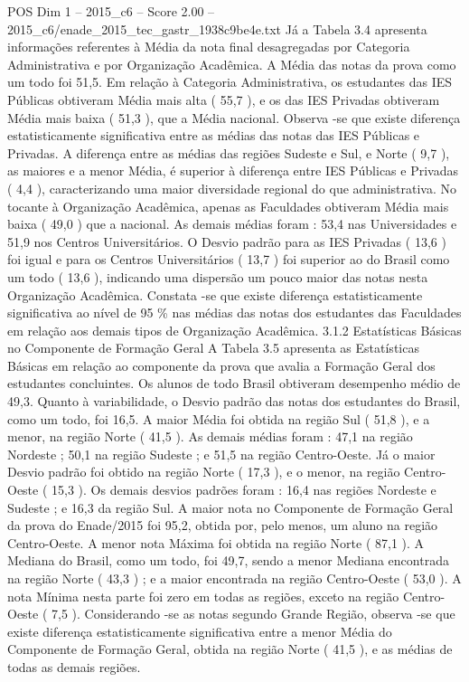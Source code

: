 \begin{textsample}{POS Dim 1 – 2015\_c6 – Score 2.00 – 2015\_c6/enade\_2015\_tec\_gastr\_1938c9be4e.txt}
Já a Tabela 3.4 apresenta informações referentes à Média da nota final desagregadas por Categoria Administrativa e por Organização Acadêmica.
A Média das notas da prova como um todo foi 51,5.
Em relação à Categoria Administrativa, os estudantes das IES Públicas obtiveram Média mais alta ( 55,7 ), e os das IES Privadas obtiveram Média mais baixa ( 51,3 ), que a Média nacional.
Observa -se que existe diferença estatisticamente significativa entre as médias das notas das IES Públicas e Privadas.
A diferença entre as médias das regiões Sudeste e Sul, e Norte ( 9,7 ), as maiores e a menor Média, é superior à diferença entre IES Públicas e Privadas ( 4,4 ), caracterizando uma maior diversidade regional do que administrativa.
No tocante à Organização Acadêmica, apenas as Faculdades obtiveram Média mais baixa ( 49,0 ) que a nacional.
As demais médias foram : 53,4 nas Universidades e 51,9 nos Centros Universitários.
O Desvio padrão para as IES Privadas ( 13,6 ) foi igual e para os Centros Universitários ( 13,7 ) foi superior ao do Brasil como um todo ( 13,6 ), indicando uma dispersão um pouco maior das notas nesta Organização Acadêmica.
Constata -se que existe diferença estatisticamente significativa ao nível de 95 \% nas médias das notas dos estudantes das Faculdades em relação aos demais tipos de Organização Acadêmica. 3.1.2 Estatísticas Básicas no Componente de Formação Geral A Tabela 3.5 apresenta as Estatísticas Básicas em relação ao componente da prova que avalia a Formação Geral dos estudantes concluintes.
Os alunos de todo Brasil obtiveram desempenho médio de 49,3.
Quanto à variabilidade, o Desvio padrão das notas dos estudantes do Brasil, como um todo, foi 16,5.
A maior Média foi obtida na região Sul ( 51,8 ), e a menor, na região Norte ( 41,5 ).
As demais médias foram : 47,1 na região Nordeste ; 50,1 na região Sudeste ; e 51,5 na região Centro-Oeste.
Já o maior Desvio padrão foi obtido na região Norte ( 17,3 ), e o menor, na região Centro-Oeste ( 15,3 ).
Os demais desvios padrões foram : 16,4 nas regiões Nordeste e Sudeste ; e 16,3 da região Sul.
A maior nota no Componente de Formação Geral da prova do Enade/2015 foi 95,2, obtida por, pelo menos, um aluno na região Centro-Oeste.
A menor nota Máxima foi obtida na região Norte ( 87,1 ).
A Mediana do Brasil, como um todo, foi 49,7, sendo a menor Mediana encontrada na região Norte ( 43,3 ) ; e a maior encontrada na região Centro-Oeste ( 53,0 ).
A nota Mínima nesta parte foi zero em todas as regiões, exceto na região Centro-Oeste ( 7,5 ).
Considerando -se as notas segundo Grande Região, observa -se que existe diferença estatisticamente significativa entre a menor Média do Componente de Formação Geral, obtida na região Norte ( 41,5 ), e as médias de todas as demais regiões.

\end{textsample}

